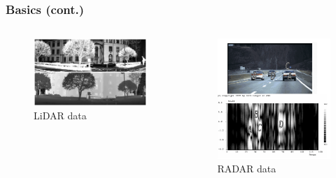 \documentclass{beamer}
\begin{document}
\begin{frame}
\frametitle{Basics (cont.)}
\begin{columns}[c] %

    \begin{figure}[htbp]
    \begin{center}
    \includegraphics[width=6cm]{graphs/lidar_data}
    \caption{LiDAR data}
    \label{default}
    \end{center}
    \end{figure}

    \begin{figure}[htbp]
    \begin{center}
    \includegraphics[width=6cm]{graphs/radar_data}
    \caption{RADAR data}
    \label{default}
    \end{center}
    \end{figure}

\end{columns}
\end{frame}

\end{document}
